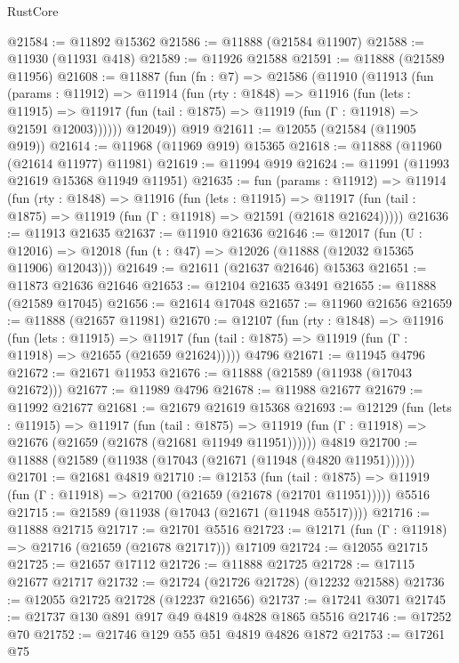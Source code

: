 \begin{lexlean}{RustCore}
\begin{coremodule}
@21584 := @11892 @15362
@21586 := @11888 (@21584 @11907)
@21588 := @11930 (@11931 @418)
@21589 := @11926 @21588
@21591 := @11888 (@21589 @11956)
@21608 := @11887
    (fun (fn : @7) =>
    @21586
      (@11910
        (@11913
          (fun (params : @11912) =>
          @11914
            (fun (rty : @1848) =>
            @11916
              (fun (lets : @11915) =>
              @11917 (fun (tail : @1875) => @11919 (fun (Γ : @11918) => @21591 @12003))))))
        @12049))
    @919
@21611 := @12055 (@21584 (@11905 @919))
@21614 := @11968 (@11969 @919) @15365
@21618 := @11888 (@11960 (@21614 @11977) @11981)
@21619 := @11994 @919
@21624 := @11991 (@11993 @21619 @15368 @11949 @11951)
@21635 := fun (params : @11912) =>
  @11914
    (fun (rty : @1848) =>
    @11916
      (fun (lets : @11915) =>
      @11917 (fun (tail : @1875) => @11919 (fun (Γ : @11918) => @21591 (@21618 @21624)))))
@21636 := @11913 @21635
@21637 := @11910 @21636
@21646 := @12017
    (fun (U : @12016) => @12018 (fun (t : @47) => @12026 (@11888 (@12032 @15365 @11906) @12043)))
@21649 := @21611 (@21637 @21646) @15363
@21651 := @11873 @21636 @21646
@21653 := @12104 @21635 @3491
@21655 := @11888 (@21589 @17045)
@21656 := @21614 @17048
@21657 := @11960 @21656
@21659 := @11888 (@21657 @11981)
@21670 := @12107
    (fun (rty : @1848) =>
    @11916
      (fun (lets : @11915) =>
      @11917 (fun (tail : @1875) => @11919 (fun (Γ : @11918) => @21655 (@21659 @21624)))))
    @4796
@21671 := @11945 @4796
@21672 := @21671 @11953
@21676 := @11888 (@21589 (@11938 (@17043 @21672)))
@21677 := @11989 @4796
@21678 := @11988 @21677
@21679 := @11992 @21677
@21681 := @21679 @21619 @15368
@21693 := @12129
    (fun (lets : @11915) =>
    @11917
      (fun (tail : @1875) =>
      @11919 (fun (Γ : @11918) => @21676 (@21659 (@21678 (@21681 @11949 @11951))))))
    @4819
@21700 := @11888 (@21589 (@11938 (@17043 (@21671 (@11948 (@4820 @11951))))))
@21701 := @21681 @4819
@21710 := @12153
    (fun (tail : @1875) => @11919 (fun (Γ : @11918) => @21700 (@21659 (@21678 (@21701 @11951)))))
    @5516
@21715 := @21589 (@11938 (@17043 (@21671 (@11948 @5517))))
@21716 := @11888 @21715
@21717 := @21701 @5516
@21723 := @12171 (fun (Γ : @11918) => @21716 (@21659 (@21678 @21717))) @17109
@21724 := @12055 @21715
@21725 := @21657 @17112
@21726 := @11888 @21725
@21728 := @17115 @21677 @21717
@21732 := @21724 (@21726 @21728) (@12232 @21588)
@21736 := @12055 @21725 @21728 (@12237 @21656)
@21737 := @17241 @3071
@21745 := @21737 @130 @891 @917 @49 @4819 @4828 @1865 @5516
@21746 := @17252 @70
@21752 := @21746 @129 @55 @51 @4819 @4826 @1872
@21753 := @17261 @75

\end{coremodule}
\end{lexlean}
